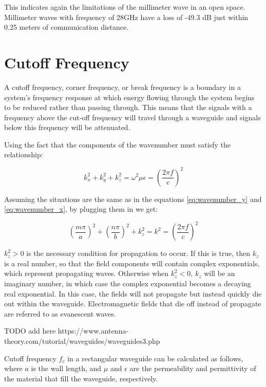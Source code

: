 \documentclass[a4paper,12pt]{report}
\begin{document}
This indicates again the limitations of the millimeter wave in an open space.
Millimeter waves with frequency of 28GHz have a loss of -49.3 dB
just within 0.25 meters of communication distance.


\section{Cutoff Frequency}

A cutoff frequency, corner frequency, or break frequency
is a boundary in a system's frequency response at which
energy flowing through the system begins to be reduced
rather than passing through.
This means that the signals with a frequency above the cut-off frequency
will travel through a waveguide and signals below this frequency
will be attenuated.

Using the fact that
the components of the wavenumber must satisfy the relationship:

\begin{equation}
  k_x^2 + k_y^2 + k_z^2 = \omega^2\mu\epsilon = \left(\frac{2\pi f}{c}\right)^2
\end{equation}

Assuming the situations are the same as
in the equations \ref{eq:wavenumber_y} and \ref{eq:wavenumber_x},
by plugging them in we get:

\begin{equation}
  \left(\frac{m\pi}{a}\right)^2 + \left(\frac{n\pi}{b}\right)^2 + k_z^2 = k^2 = \left(\frac{2\pi f}{c}\right)^2
\end{equation}

$k_z^2 > 0$ is the necessary condition for propagation to occur.
If this is true, then $k_z$ is a real number,
so that the field components will contain complex exponentials,
which represent propagating waves.
Otherwise when $k_z^2 < 0$,
$k_z$ will be an imaginary number,
in which case the complex exponential becomes a decaying real exponential.
In this case, the fields will not propagate but instead quickly die out within the waveguide.
Electromagnetic fields that die off instead of propagate are referred to as evanescent waves.

TODO add here https://www.antenna-theory.com/tutorial/waveguides/waveguides3.php

Cutoff frequency $f_c$ in a rectangular waveguide can be calculated as follows,
where $a$ is the wall length, and $\mu$ and $\epsilon$ are
the permeability and permittivity of the material
that fill the waveguide, respectively.
\end{document}

